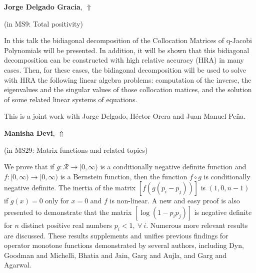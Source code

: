 \documentclass[ILAS2025-program.tex]{subfiles}
\begin{document}
\hypertarget{down0122}{}\begin{ilasabstract}
    
\textbf{Jorge Delgado Gracia},  \hfill \hyperlink{up0122}{$\Uparrow$}
    
    
(in {\color{mstitle}MS9: Total positivity})
        
\mtskip
    In this talk the bidiagonal decomposition of the Collocation Matrices of q-Jacobi Polynomials will be presented.
In addition, it will be shown that this bidiagonal decomposition can be constructed with high relative accuracy (HRA)
in many cases.
Then, for these cases, the bidiagonal decomposition will be used to solve with HRA the following linear algebra
problems: computation of the inverse, the eigenvalues and the singular values of those collocation matices, and
the solution of some related linear systems of equations.

This is a joint work with Jorge Delgado, Héctor Orera and Juan Manuel Peña.
\end{ilasabstract}
    

\hypertarget{down0047}{}\begin{ilasabstract}
    
\textbf{Manisha Devi},  \hfill \hyperlink{up0047}{$\Uparrow$}
    
    
(in {\color{mstitle}MS29: Matrix functions and related topics})
        
\mtskip
    We prove that if $g:\mathcal{R}\rightarrow[0,\infty)$ is a conditionally negative definite function and $f:[0,\infty)\rightarrow[0,\infty)$ is a Bernstein function, then the function $f\circ g$ is conditionally negative definite. The inertia of the matrix $[f(g(p_i-p_j))]$ is $(1,0,n-1)$ if $g(x)=0$ only for $x=0$ and $f$ is non-linear. A new and easy proof is also presented to demonstrate that the matrix $[\log(1-p_ip_j)]$ is negative definite for $n$ distinct positive real numbers $p_i<1, ~\forall~i$. Numerous more relevant results are discussed. These results supplements and unifies previous findings for operator monotone functions demonstrated by several authors, including Dyn, Goodman and Michelli, Bhatia and Jain, Garg and Aujla, and Garg and Agarwal.

\end{ilasabstract}
    
\end{document}
